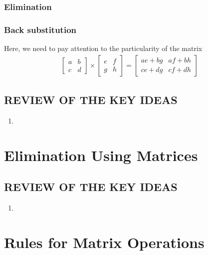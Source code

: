 \documentclass{book}
\begin{document}
        \subsubsection{Elimination}
        \subsubsection{Back substitution}
        Here, we need to pay attention to the particularity of the matrix
        \begin{align}
            \begin{bmatrix}
            a & b \\
            c & d
            \end{bmatrix}
            \times
            \begin{bmatrix}
            e & f \\
            g & h
            \end{bmatrix}
            =
            \begin{bmatrix}
            ae + bg & af + bh \\
            ce + dg & cf + dh
            \end{bmatrix}
        \end{align}

    \subsection*{REVIEW OF THE KEY IDEAS}
        \begin{enumerate}
            \item  
        \end{enumerate}
   

\section{Elimination Using Matrices}
    \subsection*{REVIEW OF THE KEY IDEAS}
        \begin{enumerate}
            \item  
        \end{enumerate}

\section{Rules for Matrix Operations}
\end{document}
